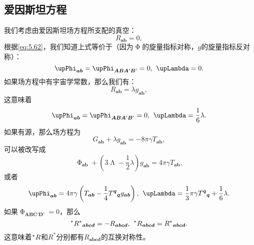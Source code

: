 \subsection{爱因斯坦方程}

我们考虑由爱因斯坦场方程所支配的真空：
\begin{equation*}
	R_{\boldsymbol{ab}} =0,
\end{equation*}
根据\ref{eq:5.62}，我们知道上式等价于（因为$\upPhi $的旋量指标对称，$g$的旋量指标反对称）：
\begin{equation*}
	\upPhi _{\boldsymbol{ab}} =\upPhi _{\boldsymbol{ABA} '\boldsymbol{B} '} =0,\kern+0.4em \upLambda =0.
\end{equation*}
如果场方程中有宇宙学常数，那么我们有：
\begin{equation*}
	R_{\boldsymbol{ab}} =\lambda g_{\boldsymbol{ab}} ,
\end{equation*}
这意味着
\begin{equation*}
	\upPhi _{\boldsymbol{ab}} =\upPhi _{\boldsymbol{ABA} '\boldsymbol{B} '} =0,\kern+0.4em \upLambda =\frac{1}{6} \lambda .
\end{equation*}
如果有源，那么场方程为
\begin{equation*}
	G_{\boldsymbol{ab}} +\lambda g_{\boldsymbol{ab}} =-8\pi \gamma T_{\boldsymbol{ab}} ,
\end{equation*}
可以被改写成
\begin{equation*}
	\upPhi _{\boldsymbol{ab}} +\left( 3\upLambda -\frac{1}{2} \lambda \right) g_{\boldsymbol{ab}} =4\pi \gamma T_{\boldsymbol{ab}} ,
\end{equation*}
或者
\begin{equation}
	\upPhi _{\boldsymbol{ab}} =4\pi \gamma \left( T_{\boldsymbol{ab}} -\frac{1}{4} T^{\boldsymbol{q}}{}_{\boldsymbol{q}} g_{\boldsymbol{ab}}\right) ,\kern+0.4em \upLambda =\frac{1}{3} \pi \gamma T^{\boldsymbol{q}}{}_{\boldsymbol{q}} +\frac{1}{6} \lambda .
	\label{eq:5.64}
\end{equation}
如果$\upPhi _{\boldsymbol{ABC} '\boldsymbol{D} '} =0$，那么
\begin{equation*}
	\prescript{*}{}{} R^{*}{}_{\boldsymbol{abcd}} =-R_{\boldsymbol{abcd}} ,\kern+0.4em \prescript{*}{}{} R_{\boldsymbol{abcd}} =R^{*}{}_{\boldsymbol{abcd}} .
\end{equation*}
这意味着$\prescript{*}{}{} R$和$R^{*}$分别都有$R_{\boldsymbol{abcd}}$的互换对称性。



